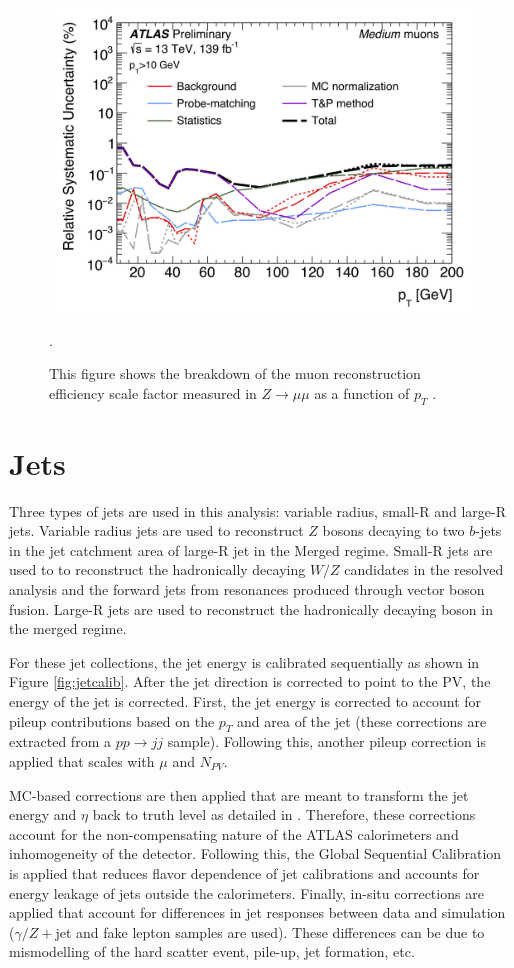 \begin{figure}[h!]
  \centering
  \includegraphics[width=\hsize]{figures/Analysis/muon_syst.png}
  \caption{{This figure shows the breakdown of the muon reconstruction efficiency scale factor measured in $Z \rightarrow \mu \mu$ as a function of $p_{T}$ \cite{muon_calib}. }}. 
  \label{fig:muon_syst}
\end{figure} 
\FloatBarrier

\section{Jets}
Three types of jets are used in this analysis: variable radius, small-R and large-R jets. Variable radius jets are used to reconstruct $Z$ bosons decaying to two $b$-jets in the jet catchment area of large-R jet in the Merged regime. Small-R jets are used to to reconstruct the hadronically decaying $W/Z$ candidates in the resolved analysis and the forward jets from resonances produced through vector boson fusion. Large-R jets are used to reconstruct the hadronically decaying boson in the merged regime.

For these jet collections, the jet energy is calibrated sequentially as shown in Figure \ref{fig:jetcalib}. After the jet direction is corrected to point to the PV, the energy of the jet is corrected. First, the jet energy is corrected to account for pileup contributions based on the $p_{T}$ and area of the jet (these corrections are extracted from a $pp \rightarrow jj$ sample). Following this, another pileup correction is applied that scales with $\mu$ and $N_{PV}$. 

MC-based corrections are then applied that are meant to transform the jet energy and $\eta$ back to truth level as detailed in \cite{jet_energy_calib}. Therefore, these corrections account for the non-compensating nature of the ATLAS calorimeters and inhomogeneity of the detector. Following this, the Global Sequential Calibration is applied that reduces flavor dependence of jet calibrations and accounts for energy leakage of jets outside the calorimeters. Finally, in-situ corrections are applied that account for differences in jet responses between data and simulation ($\gamma /Z+$jet and fake lepton samples are used). These differences can be due to mismodelling of the hard scatter event, pile-up, jet formation, etc. 

